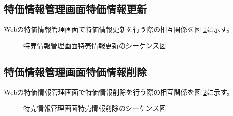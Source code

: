 \documentclass[a4j]{jarticle}
\begin{document}
\subsection{特価情報管理画面特価情報更新}
Webの特価情報管理画面で特価情報更新を行う際の相互関係を図 \ref {tab:oonishi24}に示す。
\begin{figure}[H]
\begin{center}
\caption{特売情報管理画面特売情報更新のシーケンス図}
\label{tab:oonishi24}
\end{center}
\end{figure}
\subsection{特価情報管理画面特価情報削除}
Webの特価情報管理画面で特価情報削除を行う際の相互関係を図 \ref {tab:oonishi25}に示す。
\begin{figure}[H]
\begin{center}
\caption{特売情報管理画面特売情報削除のシーケンス図}
\label{tab:oonishi25}
\end{center}
\end{figure}
\end{document}
